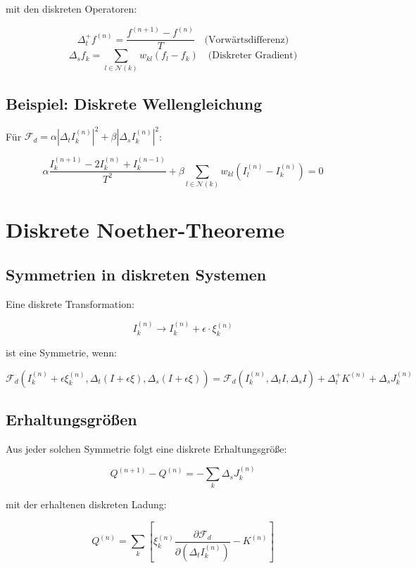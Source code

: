 mit den diskreten Operatoren:

\[
\Delta_t^+ f^{(n)} = \frac{f^{(n+1)} - f^{(n)}}{T} \quad \text{(Vorwärtsdifferenz)}
\]
\[
\Delta_s f_k = \sum_{l \in \mathcal{N}(k)} w_{kl} (f_l - f_k) \quad \text{(Diskreter Gradient)}
\]

\subsection{Beispiel: Diskrete Wellengleichung}
\label{sub:mathematik_wellengleichung}

Für \( \mathcal{F}_d = \alpha |\Delta_t I_k^{(n)}|^2 + \beta |\Delta_s I_k^{(n)}|^2 \):

\[
\alpha \frac{I_k^{(n+1)} - 2I_k^{(n)} + I_k^{(n-1)}}{T^2} + \beta \sum_{l \in \mathcal{N}(k)} w_{kl} (I_l^{(n)} - I_k^{(n)}) = 0
\]

\section{Diskrete Noether-Theoreme}
\label{app:mathematik_noether}

\subsection{Symmetrien in diskreten Systemen}
\label{sub:mathematik_symmetrien}

Eine diskrete Transformation:

\[
I_k^{(n)} \to I_k^{(n)} + \epsilon \cdot \xi_k^{(n)}
\]

ist eine Symmetrie, wenn:

\[
\mathcal{F}_d \left( I_k^{(n)} + \epsilon \xi_k^{(n)}, \Delta_t (I + \epsilon \xi), \Delta_s (I + \epsilon \xi) \right) = \mathcal{F}_d \left( I_k^{(n)}, \Delta_t I, \Delta_s I \right) + \Delta_t^+ K^{(n)} + \Delta_s J_k^{(n)}
\]

\subsection{Erhaltungsgrößen}
\label{sub:mathematik_erhaltung}

Aus jeder solchen Symmetrie folgt eine diskrete Erhaltungsgröße:

\[
Q^{(n+1)} - Q^{(n)} = -\sum_k \Delta_s J_k^{(n)}
\]

mit der erhaltenen diskreten Ladung:

\[
Q^{(n)} = \sum_k \left[ \xi_k^{(n)} \frac{\partial \mathcal{F}_d}{\partial (\Delta_t I_k^{(n)})} - K^{(n)} \right]
\]


